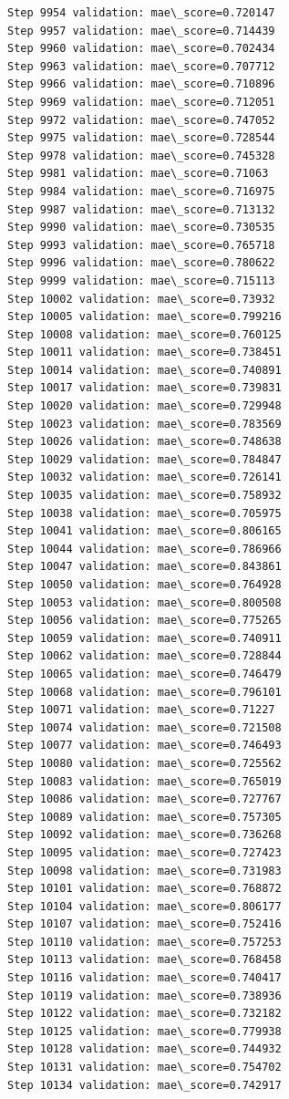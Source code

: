 \documentclass[11pt]{article}
\begin{document}
\begin{Verbatim}[commandchars=\\\{\}]
Step 9954 validation: mae\_score=0.720147
Step 9957 validation: mae\_score=0.714439
Step 9960 validation: mae\_score=0.702434
Step 9963 validation: mae\_score=0.707712
Step 9966 validation: mae\_score=0.710896
Step 9969 validation: mae\_score=0.712051
Step 9972 validation: mae\_score=0.747052
Step 9975 validation: mae\_score=0.728544
Step 9978 validation: mae\_score=0.745328
Step 9981 validation: mae\_score=0.71063
Step 9984 validation: mae\_score=0.716975
Step 9987 validation: mae\_score=0.713132
Step 9990 validation: mae\_score=0.730535
Step 9993 validation: mae\_score=0.765718
Step 9996 validation: mae\_score=0.780622
Step 9999 validation: mae\_score=0.715113
Step 10002 validation: mae\_score=0.73932
Step 10005 validation: mae\_score=0.799216
Step 10008 validation: mae\_score=0.760125
Step 10011 validation: mae\_score=0.738451
Step 10014 validation: mae\_score=0.740891
Step 10017 validation: mae\_score=0.739831
Step 10020 validation: mae\_score=0.729948
Step 10023 validation: mae\_score=0.783569
Step 10026 validation: mae\_score=0.748638
Step 10029 validation: mae\_score=0.784847
Step 10032 validation: mae\_score=0.726141
Step 10035 validation: mae\_score=0.758932
Step 10038 validation: mae\_score=0.705975
Step 10041 validation: mae\_score=0.806165
Step 10044 validation: mae\_score=0.786966
Step 10047 validation: mae\_score=0.843861
Step 10050 validation: mae\_score=0.764928
Step 10053 validation: mae\_score=0.800508
Step 10056 validation: mae\_score=0.775265
Step 10059 validation: mae\_score=0.740911
Step 10062 validation: mae\_score=0.728844
Step 10065 validation: mae\_score=0.746479
Step 10068 validation: mae\_score=0.796101
Step 10071 validation: mae\_score=0.71227
Step 10074 validation: mae\_score=0.721508
Step 10077 validation: mae\_score=0.746493
Step 10080 validation: mae\_score=0.725562
Step 10083 validation: mae\_score=0.765019
Step 10086 validation: mae\_score=0.727767
Step 10089 validation: mae\_score=0.757305
Step 10092 validation: mae\_score=0.736268
Step 10095 validation: mae\_score=0.727423
Step 10098 validation: mae\_score=0.731983
Step 10101 validation: mae\_score=0.768872
Step 10104 validation: mae\_score=0.806177
Step 10107 validation: mae\_score=0.752416
Step 10110 validation: mae\_score=0.757253
Step 10113 validation: mae\_score=0.768458
Step 10116 validation: mae\_score=0.740417
Step 10119 validation: mae\_score=0.738936
Step 10122 validation: mae\_score=0.732182
Step 10125 validation: mae\_score=0.779938
Step 10128 validation: mae\_score=0.744932
Step 10131 validation: mae\_score=0.754702
Step 10134 validation: mae\_score=0.742917

\end{Verbatim}
\end{document}
